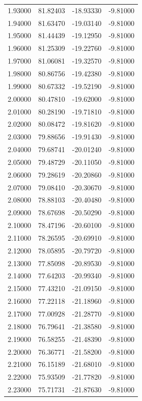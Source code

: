 \begin{table}
\begin{tabular}{llll}
1.93000 & 81.82403 & -18.93330 & -9.81000 \\
1.94000 & 81.63470 & -19.03140 & -9.81000 \\
1.95000 & 81.44439 & -19.12950 & -9.81000 \\
1.96000 & 81.25309 & -19.22760 & -9.81000 \\
1.97000 & 81.06081 & -19.32570 & -9.81000 \\
1.98000 & 80.86756 & -19.42380 & -9.81000 \\
1.99000 & 80.67332 & -19.52190 & -9.81000 \\
2.00000 & 80.47810 & -19.62000 & -9.81000 \\
2.01000 & 80.28190 & -19.71810 & -9.81000 \\
2.02000 & 80.08472 & -19.81620 & -9.81000 \\
2.03000 & 79.88656 & -19.91430 & -9.81000 \\
2.04000 & 79.68741 & -20.01240 & -9.81000 \\
2.05000 & 79.48729 & -20.11050 & -9.81000 \\
2.06000 & 79.28619 & -20.20860 & -9.81000 \\
2.07000 & 79.08410 & -20.30670 & -9.81000 \\
2.08000 & 78.88103 & -20.40480 & -9.81000 \\
2.09000 & 78.67698 & -20.50290 & -9.81000 \\
2.10000 & 78.47196 & -20.60100 & -9.81000 \\
2.11000 & 78.26595 & -20.69910 & -9.81000 \\
2.12000 & 78.05895 & -20.79720 & -9.81000 \\
2.13000 & 77.85098 & -20.89530 & -9.81000 \\
2.14000 & 77.64203 & -20.99340 & -9.81000 \\
2.15000 & 77.43210 & -21.09150 & -9.81000 \\
2.16000 & 77.22118 & -21.18960 & -9.81000 \\
2.17000 & 77.00928 & -21.28770 & -9.81000 \\
2.18000 & 76.79641 & -21.38580 & -9.81000 \\
2.19000 & 76.58255 & -21.48390 & -9.81000 \\
2.20000 & 76.36771 & -21.58200 & -9.81000 \\
2.21000 & 76.15189 & -21.68010 & -9.81000 \\
2.22000 & 75.93509 & -21.77820 & -9.81000 \\
2.23000 & 75.71731 & -21.87630 & -9.81000 \\

\end{tabular}
\end{table}

